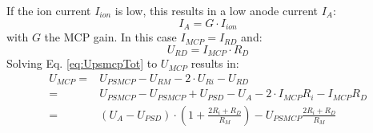 		If the ion current $I_{ion}$ is low, this results in a low anode current $I_A$:
		\begin{equation}
			I_A = G\cdot I_{ion}
		\end{equation}
		with $G$ the MCP gain. %
		In this case $I_{MCP} = I_{RD}$ and:
		\begin{equation}
			U_{RD} = I_{MCP}\cdot R_D
		\end{equation}
		Solving Eq. \eqref{eq:UpsmcpTot} to $U_{MCP}$ results in:
		\begin{align}
			U_{MCP} =& U_{PSMCP} - U_{RM} - 2\cdot U_{Ri} - U_{RD}\\
			=& U_{PSMCP} - U_{PSMCP} + U_{PSD} - U_A - 2\cdot I_{MCP} R_i - I_{MCP} R_D\\
			=& (U_A - U_{PSD})\cdot(1 + \frac{2R_i + R_D}{R_M}) - U_{PSMCP}\frac{2R_i + R_D}{R_M}
		\end{align}
		
